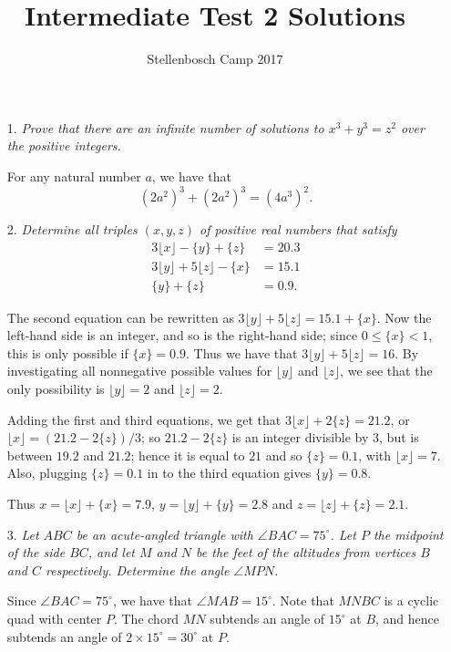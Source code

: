 \documentclass[12pt]{article}
\title{Intermediate Test 2 Solutions}
\author{Stellenbosch Camp 2017}
\begin{document}
 \maketitle

\begin{enumerate}

\item[1.] \emph{Prove that there are an infinite number of solutions to $x^3 + y^3 = z^2$ over the positive integers.}

For any natural number $a$, we have that
\[
    (2a^2)^3 + (2a^2)^3 = (4a^3)^2.
\]

\item[2.] \emph{Determine all triples $(x,y,z)$ of positive real numbers that satisfy
\begin{align*}
	3\lfloor{x}\rfloor -\{y\} +\{z\} &= 20.3 \\
	3\lfloor{y}\rfloor +5\lfloor{z}\rfloor -\{x\} &= 15.1 \\
	\{y\} +\{z\} &= 0.9.
\end{align*}
}

The second equation can be rewritten as $3\lfloor{y}\rfloor +5\lfloor{z}\rfloor = 15.1 +\{x\}$. Now the left-hand side is an integer, and so is the right-hand side; since $0 \leq \{x\} < 1$, this is only possible if $\{x\} = 0.9$. Thus we have that $3\lfloor{y}\rfloor +5\lfloor{z}\rfloor = 16$. By investigating all nonnegative possible values for $\lfloor{y}\rfloor$ and $\lfloor{z}\rfloor$, we see that the only possibility is $\lfloor{y}\rfloor = 2$ and $\lfloor{z}\rfloor = 2$.

Adding the first and third equations, we get that $3\lfloor{x}\rfloor +2\{z\} = 21.2$, or $\lfloor{x}\rfloor = (21.2-2\{z\})/3$; so $21.2-2\{z\}$ is an integer divisible by 3, but is between $19.2$ and $21.2$; hence it is equal to $21$ and so $\{z\} = 0.1$, with $\lfloor{x}\rfloor = 7$. Also, plugging $\{z\} = 0.1$ in to the third equation gives $\{y\} = 0.8$.

Thus $x = \lfloor{x}\rfloor +\{x\} = 7.9$, $y = \lfloor{y}\rfloor +\{y\} = 2.8$ and $z = \lfloor{z}\rfloor +\{z\} = 2.1$.

\item[3.] \emph{Let $ABC$ be an acute-angled triangle with $\angle BAC = 75^\circ$. Let $P$ the midpoint of the side $BC$, and let $M$ and $N$ be the feet of the altitudes from vertices $B$ and $C$ respectively. Determine the angle $\angle MPN$.}

Since $\angle BAC = 75^\circ$, we have that $\angle MAB = 15^\circ$. Note that
$MNBC$ is a cyclic quad with center $P$. The chord $MN$ subtends an angle of
$15^\circ$ at $B$, and hence subtends an angle of $2 \times 15^\circ = 30^\circ$
at $P$.


\end{enumerate}
\end{document}
